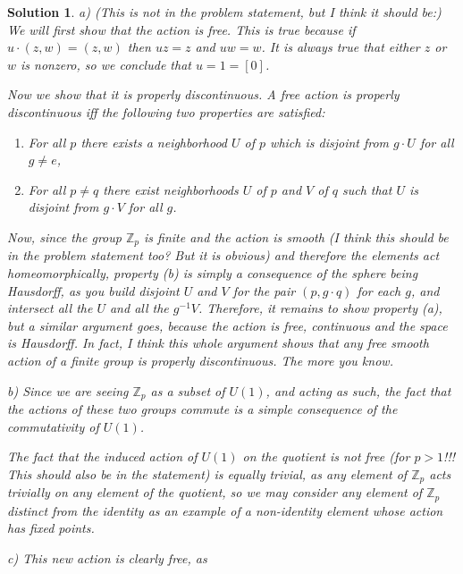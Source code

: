\documentclass{article}
\theoremstyle{nonumberplain}
\newtheorem{sol}{Solution}
\newcommand{\Z}{\mathbb{Z}}
\begin{document}
\begin{sol}
a) (This is not in the problem statement, but I think it should be:) We will first show that the action is free. This is true because if $u \cdot (z,w) = (z,w)$ then $u z = z$ and $u w = w$. It is always true that either $z$ or $w$ is nonzero, so we conclude that $u = 1 = [0]$.

Now we show that it is properly discontinuous. A free action is properly discontinuous iff the following two properties are satisfied:
\begin{enumerate}
\item For all $p$ there exists a neighborhood $U$ of $p$ which is disjoint from $g \cdot U$ for all $g \neq e$,
\item For all $p \neq q$ there exist neighborhoods $U$ of $p$ and $V$ of $q$ such that $U$ is disjoint from $g \cdot V$ for all $g$.
\end{enumerate}

Now, since the group $\Z_p$ is finite and the action is smooth (I think this should be in the problem statement too? But it is obvious) and therefore the elements act homeomorphically, property (b) is simply a consequence of the sphere being Hausdorff, as you build disjoint $U$ and $V$ for the pair $(p,g \cdot q)$ for each $g$, and intersect all the $U$ and all the $g^{-1} V$. Therefore, it remains to show property (a), but a similar argument goes, because the action is free, continuous and the space is Hausdorff. In fact, I think this whole argument shows that any free smooth action of a finite group is properly discontinuous. The more you know.

\medskip

b) Since we are seeing $\Z_p$ as a subset of $U(1)$, and acting as such, the fact that the actions of these two groups commute is a simple consequence of the commutativity of $U(1)$.

The fact that the induced action of $U(1)$ on the quotient is not free (for $p>1$!!! This should also be in the statement) is equally trivial, as any element of $\Z_p$ acts trivially on any element of the quotient, so we may consider any element of $\Z_p$ distinct from the identity as an example of a non-identity element whose action has fixed points.

\medskip

c) This new action is clearly free, as 


\end{sol}
\end{document}
